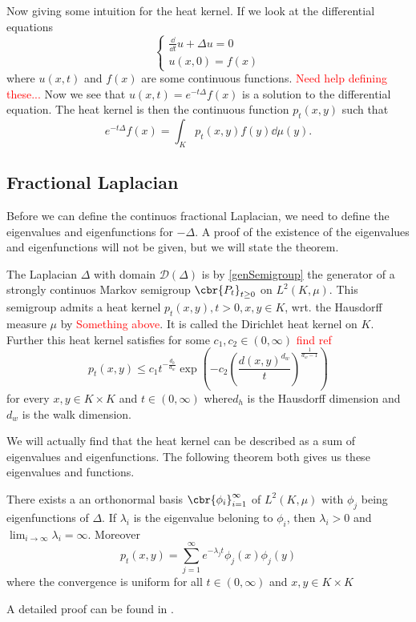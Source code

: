 Now giving some intuition for the heat kernel. If we look at the differential equations
\begin{equation}
	\begin{cases}
		\frac{\dd}{\dd t}u + \Delta u = 0 \\
		u(x,0) = f(x)
	\end{cases}
\end{equation}
where $u(x, t)$ and $f(x)$ are some continuous functions. \textcolor{red}{Need help defining these...}
Now we see that $u(x,t) = e^{-t\Delta}f(x)$ is a solution to the differential equation. The heat kernel is then the continuous function $p_t(x,y)$ such that
\begin{equation}
	e^{-t\Delta}f(x) = \int_{K} p_t(x,y)f(y) \dd \mu(y).
\end{equation}




\subsection{Fractional Laplacian}
Before we can define the continuos fractional Laplacian, we need to define the eigenvalues and eigenfunctions for $-\Delta$. A proof of the existence of the eigenvalues and eigenfunctions will not be given, but we will state the theorem.

The Laplacian $\Delta$ with domain $\mathcal{D}(\Delta)$ is by \cref{genSemigroup} the generator of a strongly continuos Markov semigroup $\cbr{P_t}_{t \geq 0}$ on $L^2(K, \mu)$. This semigroup admits a heat kernel $p_t(x,y), t > 0, x,y \in K$, wrt. the Hausdorff measure $\mu$ by \textcolor{red}{Something above}. It is called the Dirichlet heat kernel on $K$. Further this heat kernel satisfies for some $c_1, c_2 \in (0, \infty)$ \textcolor{red}{find ref}
\begin{equation}\label{heatKernelBound}
	p_t(x,y) \leq c_1 t^{-\frac{d_h}{d_w}} \exp\left(-c_2 \left(\frac{d(x,y)^{d_w}}{t}\right)^{\frac{1}{d_w -1}}\right)
\end{equation}
for every $x,y \in K \times K$ and $t \in (0, \infty)$ where$d_h$ is the Hausdorff dimension and $d_w$ is the walk dimension. 
 
 We will actually find that the heat kernel can be described as a sum of eigenvalues and eigenfunctions. The following theorem both gives us these eigenvalues and functions.
\begin{theorem}\label{heatKernelWritten}
	There exists a an orthonormal basis $\cbr{\phi_{i}}^{\infty}_{i = 1}$ of $L^2(K, \mu)$ with $\phi_j$ being eigenfunctions of $\Delta$. If $\lambda_i$ is the eigenvalue beloning to $\phi_i$, then $\lambda_i >0$ and $\lim_{i \to \infty} \lambda_i = \infty$. Moreover
	\begin{equation}
		p_t(x,y) = \sum_{j = 1}^{\infty} e^{-\lambda_j t} \phi_j(x)\phi_j(y)
	\end{equation}
	where the convergence is uniform for all $t \in (0, \infty)$ and $x,y \in K \times K$
\end{theorem}
A detailed proof can be found in \cite[Theorem 2.2]{Jozef}.

